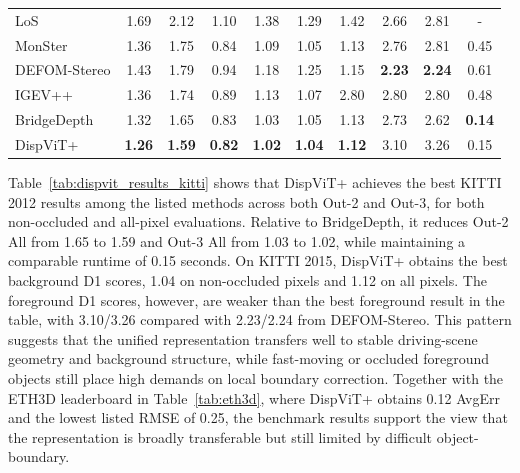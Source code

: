 \begin{table}[!t]
\begin{tabular}{l c c c c c c c c c}
		
		\hline
		LoS & 1.69 & 2.12 & 1.10 & 1.38 & 1.29 & 1.42 & 2.66 & 2.81 & - \\
		MonSter & 1.36 & 1.75 & 0.84 & 1.09 & 1.05 & 1.13 & 2.76 & 2.81 & 0.45\\
		DEFOM-Stereo & 1.43 & 1.79 & 0.94 & 1.18 & 1.25 & 1.15 & \textbf{2.23} & \textbf{2.24} & 0.61\\
		IGEV++ & 1.36 & 1.74 & 0.89 & 1.13 & 1.07 & 2.80 & 2.80 & 2.80 & 0.48 \\
		BridgeDepth & 1.32 & 1.65 & 0.83 & 1.03 & 1.05 & 1.13 & 2.73 & 2.62& \textbf{0.14} \\
		\hline
		DispViT+ & \textbf{1.26} & \textbf{1.59} & \textbf{0.82} & \textbf{1.02} & \textbf{1.04} & \textbf{1.12} & 3.10 & 3.26 & 0.15\\
		\bottomrule
	\end{tabular}
	\vspace{5pt}
\end{table}

Table~\ref{tab:dispvit_results_kitti} shows that DispViT+ achieves the best KITTI 2012 results among the listed methods across both Out-2 and Out-3, for both non-occluded and all-pixel evaluations.
Relative to BridgeDepth, it reduces Out-2 All from 1.65 to 1.59 and Out-3 All from 1.03 to 1.02, while maintaining a comparable runtime of 0.15 seconds.
On KITTI 2015, DispViT+ obtains the best background D1 scores, 1.04 on non-occluded pixels and 1.12 on all pixels.
The foreground D1 scores, however, are weaker than the best foreground result in the table, with 3.10/3.26 compared with 2.23/2.24 from DEFOM-Stereo.
This pattern suggests that the unified representation transfers well to stable driving-scene geometry and background structure, while fast-moving or occluded foreground objects still place high demands on local boundary correction.
Together with the ETH3D leaderboard in Table~\ref{tab:eth3d}, where DispViT+ obtains 0.12 AvgErr and the lowest listed RMSE of 0.25, the benchmark results support the view that the representation is broadly transferable but still limited by difficult object-boundary.

